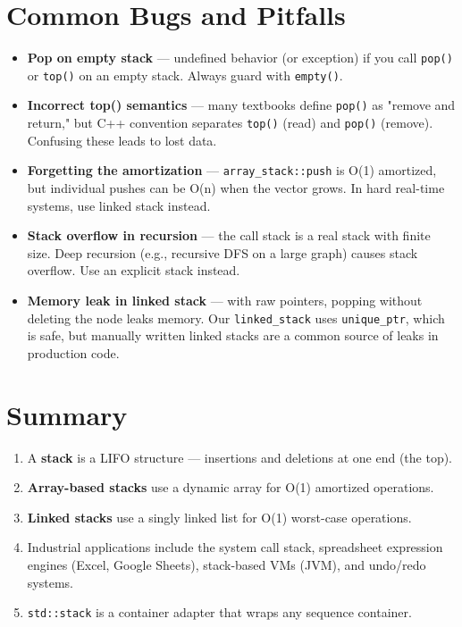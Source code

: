 \section{Common Bugs and Pitfalls}

\begin{itemize}
\item \textbf{Pop on empty stack} — undefined behavior (or exception) if you call \texttt{pop()} or \texttt{top()} on an empty stack. Always guard with \texttt{empty()}.
\item \textbf{Incorrect top() semantics} — many textbooks define \texttt{pop()} as "remove and return," but C++ convention separates \texttt{top()} (read) and \texttt{pop()} (remove). Confusing these leads to lost data.
\item \textbf{Forgetting the amortization} — \texttt{array\_stack::push} is O(1) amortized, but individual pushes can be O(n) when the vector grows. In hard real-time systems, use linked stack instead.
\item \textbf{Stack overflow in recursion} — the call stack is a real stack with finite size. Deep recursion (e.g., recursive DFS on a large graph) causes stack overflow. Use an explicit stack instead.
\item \textbf{Memory leak in linked stack} — with raw pointers, popping without deleting the node leaks memory. Our \texttt{linked\_stack} uses \texttt{unique\_ptr}, which is safe, but manually written linked stacks are a common source of leaks in production code.
\end{itemize}

\section{Summary}

\begin{enumerate}
\item A \textbf{stack} is a LIFO structure — insertions and deletions at one end (the top).
\item \textbf{Array-based stacks} use a dynamic array for O(1) amortized operations.
\item \textbf{Linked stacks} use a singly linked list for O(1) worst-case operations.
\item Industrial applications include the system call stack, spreadsheet expression engines (Excel, Google Sheets), stack-based VMs (JVM), and undo/redo systems.
\item \texttt{std::stack} is a container adapter that wraps any sequence container.
\end{enumerate}

